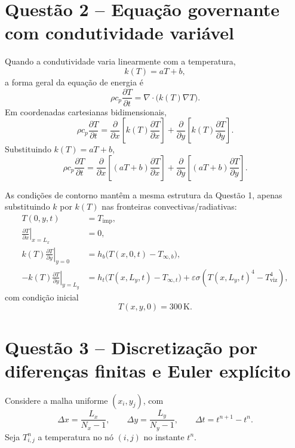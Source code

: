 \documentclass[12pt,a4paper]{article}
\begin{document}
\section{Questão 2 -- Equação governante com condutividade variável}
Quando a condutividade varia linearmente com a temperatura,
\begin{equation}
k(T)=aT+b,
\end{equation}
a forma geral da equação de energia é
\begin{equation}
\rho c_p \frac{\partial T}{\partial t}=\nabla\cdot\bigl(k(T)\nabla T\bigr).
\end{equation}
Em coordenadas cartesianas bidimensionais,
\begin{equation}
\rho c_p \frac{\partial T}{\partial t}=
\frac{\partial}{\partial x}\left[k(T)\frac{\partial T}{\partial x}\right]+
\frac{\partial}{\partial y}\left[k(T)\frac{\partial T}{\partial y}\right].
\label{eq:governante_variavel}
\end{equation}
Substituindo $k(T)=aT+b$,
\begin{equation}
\rho c_p \frac{\partial T}{\partial t}=
\frac{\partial}{\partial x}\left[(aT+b)\frac{\partial T}{\partial x}\right]+
\frac{\partial}{\partial y}\left[(aT+b)\frac{\partial T}{\partial y}\right].
\end{equation}

As condições de contorno mantêm a mesma estrutura da Questão 1, apenas substituindo $k$ por $k(T)$ nas fronteiras convectivas/radiativas:
\begin{align}
T(0,y,t) &= T_{\text{imp}}, \\
\left.\frac{\partial T}{\partial x}\right|_{x=L_x} &= 0, \\
k(T)\left.\frac{\partial T}{\partial y}\right|_{y=0} &= h_b\bigl(T(x,0,t)-T_{\infty,b}\bigr), \\
-k(T)\left.\frac{\partial T}{\partial y}\right|_{y=L_y} &= h_t\bigl(T(x,L_y,t)-T_{\infty,t}\bigr) + \varepsilon \sigma \left(T(x,L_y,t)^4 - T_{\text{viz}}^4\right),
\end{align}
com condição inicial
\begin{equation}
T(x,y,0)=300\,\text{K}.
\end{equation}

\section{Questão 3 -- Discretização por diferenças finitas e Euler explícito}
Considere a malha uniforme $(x_i,y_j)$, com
\begin{equation}
\Delta x = \frac{L_x}{N_x-1},
\qquad
\Delta y = \frac{L_y}{N_y-1},
\qquad
\Delta t = t^{n+1}-t^n.
\end{equation}
Seja $T_{i,j}^n$ a temperatura no nó $(i,j)$ no instante $t^n$.
\end{document}
